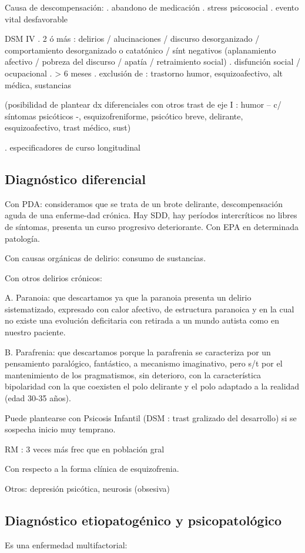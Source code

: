 \documentclass{scrbook}
\begin{document}
Causa de descompensación: 
. abandono de medicación
. stress psicosocial
. evento vital desfavorable 

DSM IV
. 2 ó más : delirios / alucinaciones / discurso desorganizado / comportamiento desorganizado o catatónico / sínt negativos (aplanamiento afectivo / pobreza del discurso / apatía / retraimiento social)
. disfunción social / ocupacional
. > 6 meses
. exclusión de : trastorno humor, esquizoafectivo, alt médica, sustancias

(posibilidad de plantear dx diferenciales con otros trast de eje I : humor – c/ síntomas psicóticos -, esquizofreniforme, psicótico breve, delirante, esquizoafectivo, trast médico, sust)

. especificadores de curso longitudinal
\subsection*{Diagnóstico diferencial}
Con PDA: consideramos que se trata de un brote delirante, descompensación aguda de una enferme-dad crónica. Hay SDD, hay períodos intercríticos no libres de síntomas, presenta un curso progresivo deteriorante. Con EPA en determinada patología.

Con causas orgánicas de delirio: consumo de sustancias.

Con otros delirios crónicos:

A. Paranoia: que descartamos ya que la paranoia presenta un delirio sistematizado, expresado con calor afectivo, de estructura paranoica y en la cual no existe una evolución deficitaria con retirada a un mundo autista como en nuestro paciente.

B. Parafrenia: que descartamos porque la parafrenia se caracteriza por un pensamiento paralógico, fantástico, a mecanismo imaginativo, pero s/t por el mantenimiento de los pragmatismos, sin deterioro, con la característica bipolaridad con la que coexisten el polo delirante y el polo adaptado a la realidad (edad 30-35 años).

Puede plantearse con Psicosis Infantil (DSM : trast gralizado del desarrollo) si se sospecha inicio muy temprano.

RM : 3 veces más frec que en población gral

Con respecto a la forma clínica de esquizofrenia.

Otros: depresión psicótica, neurosis (obsesiva)
\subsection*{Diagnóstico etiopatogénico y psicopatológico}
Es una enfermedad multifactorial:
\end{document}
